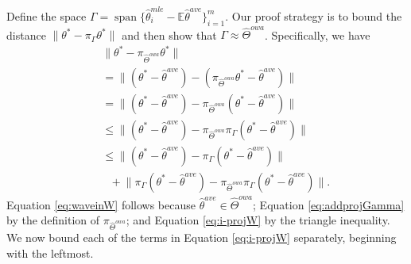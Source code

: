 \documentclass[twoside]{article}
\DeclareMathOperator*{\vecspan}{span}
\newcommand{\matW}{\hat W}
\newcommand{\W}{{\hat \Theta^{\textit{owa}}}}
\newcommand{\E}{\mathbb{E}}
\newcommand{\w}{\theta}
\newcommand{\wave}{\hat\w^{ave}}
\newcommand{\wmle}{\hat\w^{mle}}
\newcommand{\wstar}{{\w^{*}}}
\newcommand{\ltwo}[1]{{\lVert {#1} \rVert}}
\newcommand{\proj}[1]{\pi_{{#1}}}
\begin{document}
Define the space $\Gamma=\vecspan\{\wmle_i-\E\wave\}_{i=1}^m$.
Our proof strategy is to bound the distance $\ltwo{\wstar-\proj\Gamma\wstar}$ and then show that $\Gamma\approx\W$.
Specifically, we have
\begin{align}
~~~~&\!\!\!\!\!\!\!\!\!\!\!\!\!%
\ltwo{\wstar-\proj\W\wstar}
\nonumber
\\
&=
\ltwo{(\wstar-\wave) - (\proj\W\wstar - \wave)}
\\
&=
\ltwo{(\wstar-\wave) - \proj\W(\wstar - \wave)}
\label{eq:waveinW}
\\
&\le
\ltwo{(\wstar-\wave) - \proj\W\proj\Gamma(\wstar - \wave)}
\label{eq:addprojGamma}
\\
&\le
\ltwo{(\wstar-\wave) - \proj\Gamma(\wstar-\wave)}
\nonumber
\\
&~~~+
\ltwo{\proj\Gamma(\wstar-\wave) - \proj\W\proj\Gamma(\wstar-\wave)}
.
\label{eq:i-projW}
\end{align}
Equation \ref{eq:waveinW} follows because $\wave\in\W$;
Equation \ref{eq:addprojGamma} by the definition of $\proj\W$;
and Equation \ref{eq:i-projW} by the triangle inequality.
We now bound each of the terms in Equation \ref{eq:i-projW} separately,
beginning with the leftmost.
\end{document}
